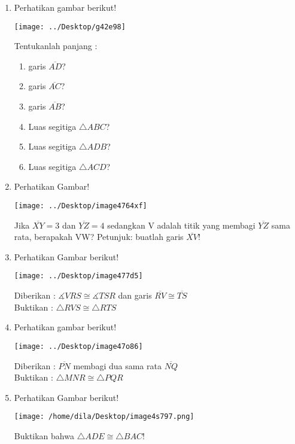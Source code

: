 \documentclass[12pt,a4paper]{article}
\begin{document}
\begin{enumerate}
		
		\item Perhatikan gambar berikut!\\
		\begin{center}
			\texttt{[image: ../Desktop/g42e98]}\\
		\end{center}
		Tentukanlah panjang :
		\begin{enumerate}
			\item garis $\overline{AD}$?
			\item garis $\overline{AC}$?
			\item garis $\overline{AB}$?
			\item Luas segitiga $\triangle ABC$?
			\item Luas segitiga $\triangle ADB$?
			\item Luas segitiga $\triangle ACD$?
		\end{enumerate}
		\item Perhatikan Gambar!
		\begin{center}
			\texttt{[image: ../Desktop/image4764xf]}
		\end{center}
		Jika $\overline{XY}=3$ dan $\overline{YZ}=4$ sedangkan V adalah titik yang membagi $\overline{YZ}$ sama rata, berapakah VW? Petunjuk: buatlah garis $\overline{XV}$! 
		\item Perhatikan Gambar berikut!
		
\begin{center}
\texttt{[image: ../Desktop/image477d5]}
\end{center}
	Diberikan : $\measuredangle VRS \cong \measuredangle TSR$ dan garis $\overline{RV} \cong \overline{TS}$\\
	Buktikan : $\triangle RVS \cong \triangle RTS$
\item Perhatikan gambar berikut!

		
\begin{center}
\texttt{[image: ../Desktop/image47o86]}
\end{center}
	Diberikan : $\overline{PN}$ membagi dua sama rata $\overline{NQ}$\\
	Buktikan : $\triangle MNR \cong \triangle PQR$
\item Perhatikan Gambar berikut!
\begin{center}
	\texttt{[image: /home/dila/Desktop/image4s797.png]}
\end{center}
	Buktikan bahwa $\triangle ADE \cong \triangle BAC$!
	\end{enumerate}
\end{document}

